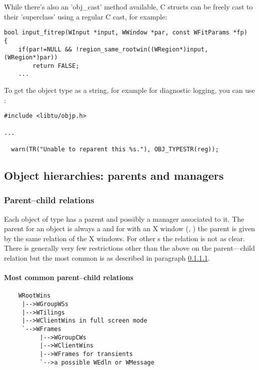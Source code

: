While there's also an 'obj\_cast' method available, C structs can be freely 
cast to their 'superclass' using a regular C cast, for example:

\begin{verbatim}
bool input_fitrep(WInput *input, WWindow *par, const WFitParams *fp)
{
    if(par!=NULL && !region_same_rootwin((WRegion*)input, (WRegion*)par))
        return FALSE;
    ...
\end{verbatim}

To get the object type as a string, for example for diagnostic logging, you can use :

\begin{verbatim}
#include <libtu/objp.h>

...

  warn(TR("Unable to reparent this %s."), OBJ_TYPESTR(reg));
\end{verbatim}

\subsection{Object hierarchies:  parents and managers}

\subsubsection{Parent--child relations}
Each object of type  has a parent and possibly a manager
associated to it. The parent for an object is always a 
 and for  with an X window (,
) the parent  is given by the same relation of
the X windows. For other s the relation is not as clear.
There is generally very few restrictions other than the above on the
parent---child relation but the most common is as described in
paragraph \ref{par:parentship}.

\paragraph{Most common parent--child relations}
\label{par:parentship}

\begin{verbatim}
    WRootWins
     |-->WGroupWSs
     |-->WTilings
     |-->WClientWins in full screen mode
     `-->WFrames
          |-->WGroupCWs
          |-->WClientWins
          |-->WFrames for transients
          `-->a possible WEdln or WMessage
\end{verbatim}

